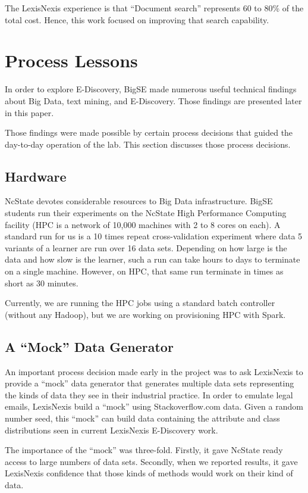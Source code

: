\documentclass{sig-alternate-05-2015}
\begin{document}
The LexisNexis experience is that
``Document search'' represents 60 to 80\% of the total  cost. Hence, this
work focused on improving that search capability. 


\section{Process Lessons}

In order to explore E-Discovery, BigSE made numerous useful technical findings about Big Data, text mining,
and E-Discovery. Those findings are presented later in this paper.

Those findings were made possible by certain process decisions that guided
the day-to-day operation of the lab. This section discusses those process decisions. 



\subsection{Hardware}
 NcState devotes considerable resources to Big Data infrastructure. 
BigSE students run their experiments on the   NcState
High Performance Computing facility (HPC is a network of 10,000 machines with 2 to 8 cores on each).
A standard run for us is a 10 times repeat cross-validation experiment where data
5 variants of a learner are run over 16 data sets. Depending on how large
is the data and how slow is the learner, such a run can take hours to days to 
terminate on a single machine.  However, on HPC, that same run terminate in times
as short as 30 minutes.

Currently, we are running the HPC jobs using a standard batch controller (without any
Hadoop), but we are
working on provisioning HPC with Spark.

\subsection{A ``Mock'' Data Generator}
An important process decision made early in the project was to ask
LexisNexis to provide a ``mock'' data generator  that generates multiple data sets
representing the kinds of data they see in their industrial practice.
In order to emulate legal emails, LexisNexis build a ``mock'' using Stackoverflow.com
data. Given a random number seed, this ``mock'' can build data containing the attribute
and class distributions seen in current LexisNexis E-Discovery work.

The importance of the ``mock'' was three-fold. Firstly, it gave NcState ready access to large
numbers of data sets. Secondly, when we reported results, it gave LexisNexis confidence
that those kinds of methods would work on their kind of data.
\end{document}
